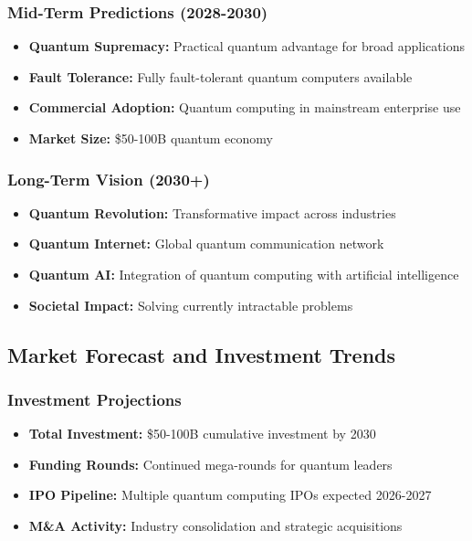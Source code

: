 \documentclass[12pt,a4paper]{article}
\begin{document}
\subsubsection{Mid-Term Predictions (2028-2030)}
\begin{itemize}
    \item \textbf{Quantum Supremacy:} Practical quantum advantage for broad applications
    \item \textbf{Fault Tolerance:} Fully fault-tolerant quantum computers available
    \item \textbf{Commercial Adoption:} Quantum computing in mainstream enterprise use
    \item \textbf{Market Size:} \$50-100B quantum economy
\end{itemize}

\subsubsection{Long-Term Vision (2030+)}
\begin{itemize}
    \item \textbf{Quantum Revolution:} Transformative impact across industries
    \item \textbf{Quantum Internet:} Global quantum communication network
    \item \textbf{Quantum AI:} Integration of quantum computing with artificial intelligence
    \item \textbf{Societal Impact:} Solving currently intractable problems
\end{itemize}

\subsection{Market Forecast and Investment Trends}

\subsubsection{Investment Projections}
\begin{itemize}
    \item \textbf{Total Investment:} \$50-100B cumulative investment by 2030
    \item \textbf{Funding Rounds:} Continued mega-rounds for quantum leaders
    \item \textbf{IPO Pipeline:} Multiple quantum computing IPOs expected 2026-2027
    \item \textbf{M\&A Activity:} Industry consolidation and strategic acquisitions
\end{itemize}
\end{document}
